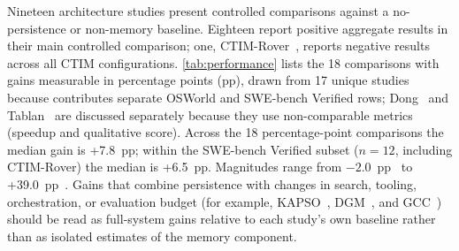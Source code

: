 Nineteen architecture studies present controlled comparisons against a
no-persistence or non-memory baseline.
Eighteen report positive aggregate results in their main controlled
comparison; one, CTIM-Rover~\citep{lindenbauer2025ctimrover}, reports
negative results across all CTIM configurations.
\autoref{tab:performance} lists the 18 comparisons with gains measurable
in percentage points (pp), drawn from 17 unique studies because
\citet{su2025learnbyinteract} contributes separate OSWorld and
SWE-bench Verified rows;
Dong~\citep{dong2026kernelblaster} and
Tablan~\citep{tablan2025smarter} are discussed separately because they
use non-comparable metrics (speedup and qualitative score).
Across the 18 percentage-point comparisons the median gain is
+7.8~pp;
within the SWE-bench Verified subset ($n=12$, including CTIM-Rover) the
median is +6.5~pp.
Magnitudes range from $-2.0$~pp~\citep{lindenbauer2025ctimrover} to
+39.0~pp~\citep{li2026traversalaspolicy}.
Gains that combine persistence with changes in search, tooling,
orchestration, or evaluation budget (for example,
KAPSO~\citep{nadafian2026kapso}, DGM~\citep{zhang2025darwingodel}, and
GCC~\citep{wu2025gcc}) should be read as full-system gains relative to
each study's own baseline rather than as isolated estimates of the
memory component.

